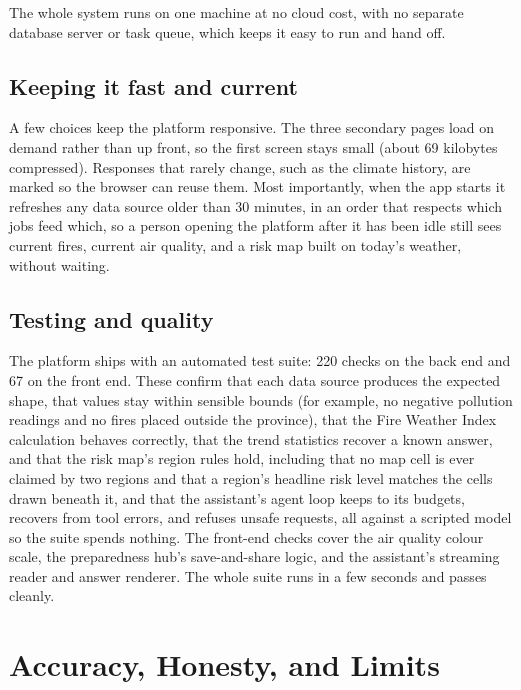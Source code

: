 \documentclass[11pt]{article}
\begin{document}
The whole system runs on one machine at no cloud cost, with no separate database
server or task queue, which keeps it easy to run and hand off.

\subsection{Keeping it fast and current}

A few choices keep the platform responsive. The three secondary pages load on
demand rather than up front, so the first screen stays small (about 69 kilobytes
compressed). Responses that rarely change, such as the climate history, are
marked so the browser can reuse them. Most importantly, when the app starts
it refreshes any data source older than 30 minutes, in an order that respects
which jobs feed which, so a person opening the platform after it has been idle
still sees current fires, current air quality, and a risk map built on today's
weather, without waiting.

\subsection{Testing and quality}

The platform ships with an automated test suite: 220 checks on the back end and
67 on the front end. These confirm that each data source produces the expected
shape, that values stay within sensible bounds (for example, no negative
pollution readings and no fires placed outside the province), that the Fire
Weather Index calculation behaves correctly, that the trend statistics recover a
known answer, and that the risk map's region rules hold, including that no map
cell is ever claimed by two regions and that a region's headline risk level
matches the cells drawn beneath it, and that the assistant's agent loop keeps to
its budgets, recovers from tool errors, and refuses unsafe requests, all against
a scripted model so the suite spends nothing. The front-end checks cover the air
quality colour scale, the preparedness hub's save-and-share logic, and the
assistant's streaming reader and answer renderer. The whole suite
runs in a few seconds and passes cleanly.

\section{Accuracy, Honesty, and Limits}
\end{document}
